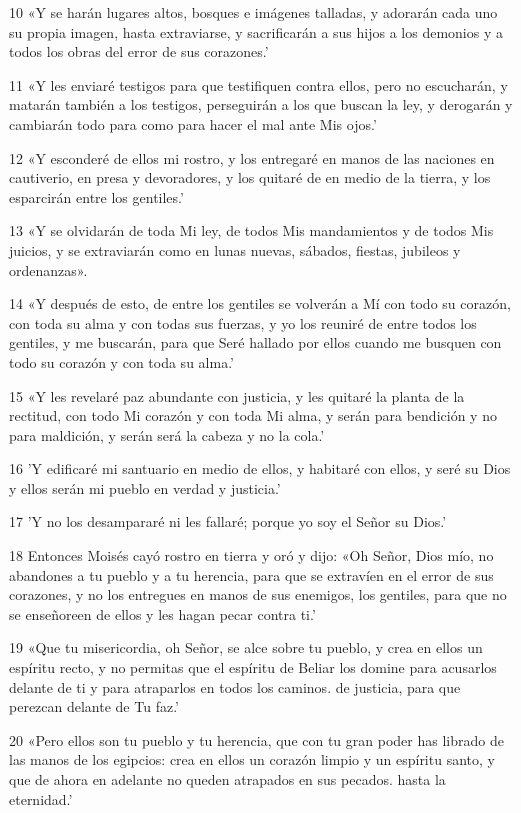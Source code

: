 \par 10 «Y se harán lugares altos, bosques e imágenes talladas, y adorarán cada uno su propia imagen, hasta extraviarse, y sacrificarán a sus hijos a los demonios y a todos los obras del error de sus corazones.'
\par 11 «Y les enviaré testigos para que testifiquen contra ellos, pero no escucharán, y matarán también a los testigos, perseguirán a los que buscan la ley, y derogarán y cambiarán todo para como para hacer el mal ante Mis ojos.'
\par 12 «Y esconderé de ellos mi rostro, y los entregaré en manos de las naciones en cautiverio, en presa y devoradores, y los quitaré de en medio de la tierra, y los esparcirán entre los gentiles.'
\par 13 «Y se olvidarán de toda Mi ley, de todos Mis mandamientos y de todos Mis juicios, y se extraviarán como en lunas nuevas, sábados, fiestas, jubileos y ordenanzas».
\par 14 «Y después de esto, de entre los gentiles se volverán a Mí con todo su corazón, con toda su alma y con todas sus fuerzas, y yo los reuniré de entre todos los gentiles, y me buscarán, para que Seré hallado por ellos cuando me busquen con todo su corazón y con toda su alma.'
\par 15 «Y les revelaré paz abundante con justicia, y les quitaré la planta de la rectitud, con todo Mi corazón y con toda Mi alma, y ​​serán para bendición y no para maldición, y serán será la cabeza y no la cola.'
\par 16 'Y edificaré mi santuario en medio de ellos, y habitaré con ellos, y seré su Dios y ellos serán mi pueblo en verdad y justicia.'
\par 17 'Y no los desampararé ni les fallaré; porque yo soy el Señor su Dios.'
\par 18 Entonces Moisés cayó rostro en tierra y oró y dijo: «Oh Señor, Dios mío, no abandones a tu pueblo y a tu herencia, para que se extravíen en el error de sus corazones, y no los entregues en manos de sus enemigos, los gentiles, para que no se enseñoreen de ellos y les hagan pecar contra ti.'
\par 19 «Que tu misericordia, oh Señor, se alce sobre tu pueblo, y crea en ellos un espíritu recto, y no permitas que el espíritu de Beliar los domine para acusarlos delante de ti y para atraparlos en todos los caminos. de justicia, para que perezcan delante de Tu faz.'
\par 20 «Pero ellos son tu pueblo y tu herencia, que con tu gran poder has librado de las manos de los egipcios: crea en ellos un corazón limpio y un espíritu santo, y que de ahora en adelante no queden atrapados en sus pecados. hasta la eternidad.'
